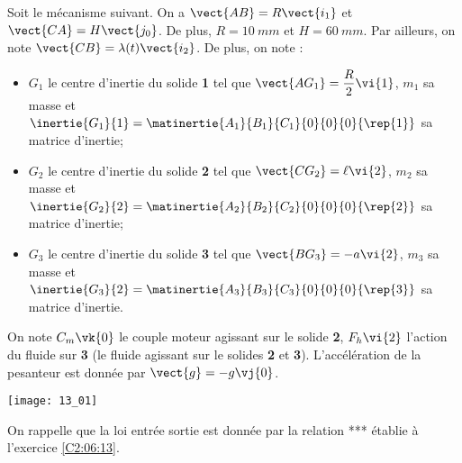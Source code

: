 \normaltrue \difficilefalse \tdifficilefalse
\correctionfalse


\setcounter{question}{0}%

\ifcorrection
\else
{}
\fi

\ifprof
\else
Soit le mécanisme suivant. On a $\vect{AB}=R\vect{i_1}$ et $\vect{CA}=H\vect{j_0}$. De plus, 
$R=\SI{10}{mm}$ et $H=\SI{60}{mm}$. Par ailleurs, on note $\vect{CB}=\lambda(t) \vect{i_2}$.
De plus, on note :
\begin{itemize}
\item $G_1$ le centre d'inertie du solide \textbf{1} tel que $\vect{AG_1}=\dfrac{R}{2} \vi{1}$, $m_1$ sa masse et $\inertie{G_1}{1}=\matinertie{A_1}{B_1}{C_1}{0}{0}{0}{\rep{1}}$ sa matrice d'inertie;
\item $G_2$ le centre d'inertie du solide \textbf{2} tel que $\vect{CG_2}=\ell \vi{2}$, $m_2$ sa masse et $\inertie{G_2}{2}=\matinertie{A_2}{B_2}{C_2}{0}{0}{0}{\rep{2}}$ sa matrice d'inertie;
\item $G_3$ le centre d'inertie du solide \textbf{3} tel que $\vect{BG_3}=-a \vi{2}$, $m_3$ sa masse et $\inertie{G_3}{2}=\matinertie{A_3}{B_3}{C_3}{0}{0}{0}{\rep{3}}$ sa matrice d'inertie.
\end{itemize}
On note $C_m\vk{0}$ le couple moteur agissant sur le solide \textbf{2}, $F_h\vi{2}$ l'action du fluide sur \textbf{3} (le fluide agissant sur le solides  \textbf{2} et \textbf{3}). L'accélération de la pesanteur est donnée par $\vect{g}=-g\vj{0}$.

\begin{marginfigure}
\texttt{[image: 13\_01]}
\end{marginfigure}
\fi

On rappelle que la loi entrée sortie est donnée par la relation *** établie à l'exercice \ref{C2:06:13}.

\ifprof
\else
\fi

\ifprof
\else
\fi

\ifprof
\else
\fi

\ifprof
\else
\fi

\ifprof
\else
\fi


\ifprof
\else


\fi